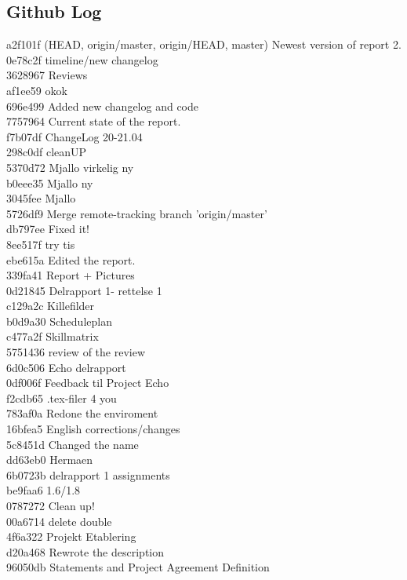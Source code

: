 \documentclass[12pt,a4paper]{article}
\begin{document}
\subsection{Github Log}
\noindent\makebox[\linewidth]{\rule{16.5cm}{0.4pt}}
a2f101f (HEAD, origin/master, origin/HEAD, master) Newest version of report 2.\\
0e78c2f timeline/new changelog\\
3628967 Reviews\\
af1ee59 okok\\
696e499 Added new changelog and code\\
7757964 Current state of the report.\\
f7b07df ChangeLog 20-21.04\\
298c0df cleanUP\\
5370d72 Mjallo virkelig ny\\
b0eee35 Mjallo ny\\
3045fee Mjallo\\
5726df9 Merge remote-tracking branch 'origin/master'\\
db797ee Fixed it!\\
8ee517f try tis\\
ebe615a Edited the report.\\
339fa41 Report + Pictures\\
0d21845 Delrapport 1- rettelse 1\\
c129a2c Killefilder\\
b0d9a30 Scheduleplan\\
c477a2f Skillmatrix\\
5751436 review of the review\\
6d0c506 Echo delrapport\\
0df006f Feedback til Project Echo\\
f2cdb65 .tex-filer 4 you\\
783af0a Redone the enviroment\\
16bfea5 English corrections/changes\\
5c8451d Changed the name\\
dd63eb0 Hermaen\\
6b0723b delrapport 1 assignments\\
be9faa6 1.6/1.8\\
0787272 Clean up!\\
00a6714 delete double\\
4f6a322 Projekt Etablering\\
d20a468 Rewrote the description\\
96050db Statements and Project Agreement Definition\\
\end{document}
